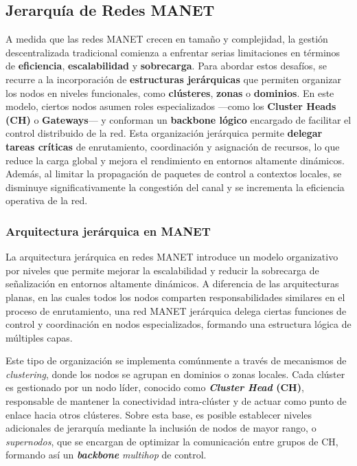 \documentclass{article}
\begin{document}
\subsection{Jerarquía de Redes MANET}
A medida que las redes MANET crecen en tamaño y complejidad, la gestión descentralizada tradicional comienza a enfrentar serias limitaciones en términos de \textbf{eficiencia}, \textbf{escalabilidad} y \textbf{sobrecarga}. Para abordar estos desafíos, se recurre a la incorporación de \textbf{estructuras jerárquicas} que permiten organizar los nodos en niveles funcionales, como \textbf{clústeres}, \textbf{zonas} o \textbf{dominios}. En este modelo, ciertos nodos asumen roles especializados —como los \textbf{Cluster Heads (CH)} o \textbf{Gateways}— y conforman un \textbf{backbone lógico} encargado de facilitar el control distribuido de la red. Esta organización jerárquica permite \textbf{delegar tareas críticas} de enrutamiento, coordinación y asignación de recursos, lo que reduce la carga global y mejora el rendimiento en entornos altamente dinámicos. Además, al limitar la propagación de paquetes de control a contextos locales, se disminuye significativamente la congestión del canal y se incrementa la eficiencia operativa de la red.


\subsubsection{Arquitectura jerárquica en MANET}
La arquitectura jerárquica en redes MANET introduce un modelo organizativo por niveles que permite mejorar la escalabilidad y reducir la sobrecarga de señalización en entornos altamente dinámicos. A diferencia de las arquitecturas planas, en las cuales todos los nodos comparten responsabilidades similares en el proceso de enrutamiento, una red MANET jerárquica delega ciertas funciones de control y coordinación en nodos especializados, formando una estructura lógica de múltiples capas.

Este tipo de organización se implementa comúnmente a través de mecanismos de \textit{clustering}, donde los nodos se agrupan en dominios o zonas locales. Cada clúster es gestionado por un nodo líder, conocido como \textbf{\textit{Cluster Head} (CH)}, responsable de mantener la conectividad intra-clúster y de actuar como punto de enlace hacia otros clústeres. Sobre esta base, es posible establecer niveles adicionales de jerarquía mediante la inclusión de nodos de mayor rango, o \textit{supernodos}, que se encargan de optimizar la comunicación entre grupos de CH, formando así un \textbf{\textit{backbone}} \textit{multihop} de control.
\end{document}
